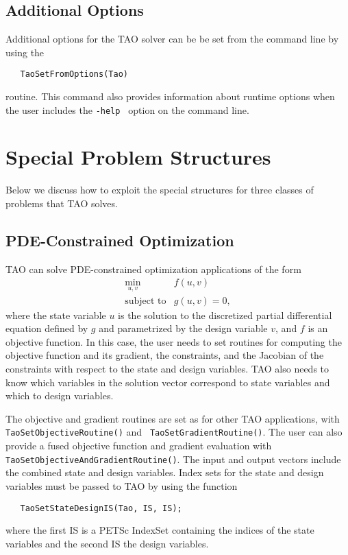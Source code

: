 \subsection{Additional Options}
Additional options for the TAO solver 
can be be set from the command line by using the  
\begin{verbatim}
   TaoSetFromOptions(Tao)
\end{verbatim}
routine. 
This command also provides information about runtime options when the
user includes the {\tt -help } option on the command line.

\section{Special Problem Structures}
Below we discuss how to exploit the special structures for three classes
of problems that TAO solves. 

\subsection{PDE-Constrained Optimization}\label{sec:pde_applications}
TAO can solve PDE-constrained optimization applications 
of the form
\[
\begin{array}{ll}
\displaystyle \min_{u,v} & f(u,v) \\
\mbox{subject to} & g(u,v) = 0,
\end{array}
\]
where the state variable $u$ is the solution to the discretized partial 
differential equation defined by $g$ and parametrized by the design 
variable $v$, and $f$ is an objective function.  In this case, the 
user needs to set routines for computing the objective function
and its gradient, the constraints, and the Jacobian of the constraints
with respect to the state and design variables.  TAO also needs to know 
which variables in the solution vector correspond to state variables 
and which to design variables.

The objective and gradient routines are set as for other TAO applications,
with {\tt Tao\-Set\-Object\-ive\-Routine()} and {\tt
Tao\-Set\-Gradient\-Routine()}.  The user can also provide a fused
objective function and gradient
evaluation with {\tt Tao\-Set\-Objective\-And\-Gradient\-Routine()}.
The input and output vectors include the combined state and design 
variables.  Index sets for the state and design variables must be 
passed to TAO by using the function
\begin{verbatim}
   TaoSetStateDesignIS(Tao, IS, IS);
\end{verbatim}
where the first IS is a PETSc Index\-Set containing the indices of the
state variables and the second IS the design variables.

